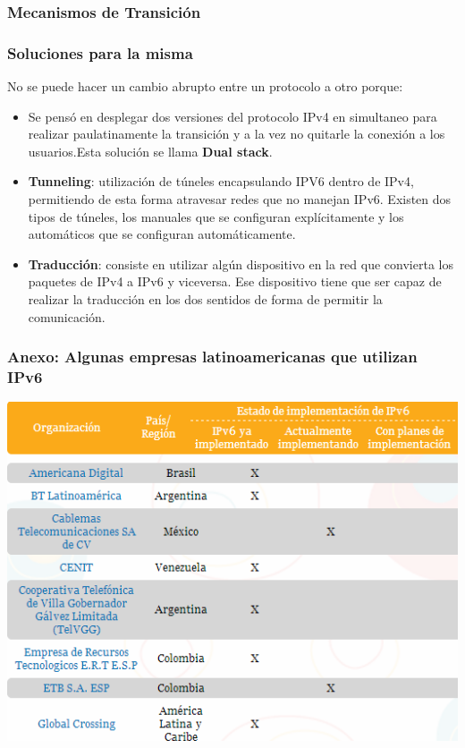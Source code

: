 \documentclass{beamer}
\begin{document}
\begin{frame}
\frametitle{Mecanismos de Transición}
\frametitle{Soluciones para la misma}
No se puede hacer un cambio abrupto entre un protocolo a otro porque: 
\begin{itemize}
\item Se pensó en desplegar dos versiones del protocolo IPv4 en simultaneo para realizar paulatinamente la transición y a la vez no quitarle la conexión a los usuarios.Esta solución se llama \textbf{Dual stack}.

\item \textbf{Tunneling}: utilización de túneles encapsulando IPV6 dentro de IPv4, permitiendo de esta forma atravesar redes que no manejan IPv6. Existen dos tipos de túneles, los manuales que  se configuran explícitamente y  los automáticos que se configuran automáticamente.
\item  \textbf{Traducción}: consiste en utilizar algún dispositivo en la red que convierta los paquetes de IPv4 a IPv6 y 
viceversa. Ese dispositivo tiene que ser capaz de realizar la traducción en los dos sentidos de 
forma de permitir la comunicación. 

\end{itemize}

\end{frame}

\begin{frame}
\frametitle{ Anexo: Algunas empresas latinoamericanas que utilizan IPv6}
\centering
\includegraphics[height=.8\textheight]{empresas_ipv6_la.png}

\end{frame}
\end{document}
